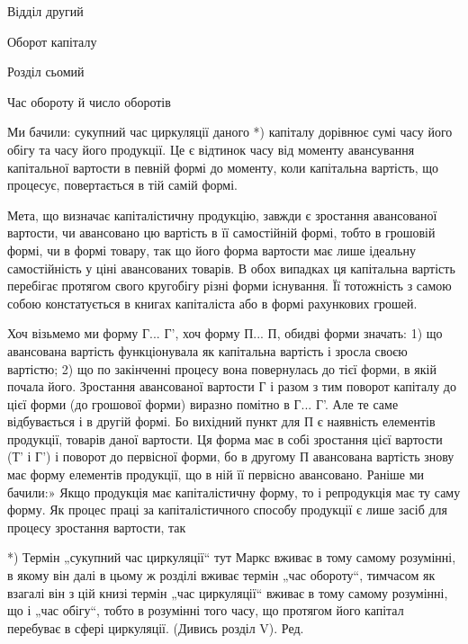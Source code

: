 Відділ другий

Оборот капіталу

Розділ сьомий

Час обороту й число оборотів

Ми бачили: сукупний час циркуляції даного *) капіталу дорівнює сумі
часу його обігу та часу його продукції. Це є відтинок часу від моменту
авансування капітальної вартости в певній формі до моменту, коли капітальна
вартість, що процесує, повертається в тій самій формі.

Мета, що визначає капіталістичну продукцію, завжди є зростання
авансованої вартости, чи авансовано цю вартість в її самостійній формі,
тобто в грошовій формі, чи в формі товару, так що його форма вартости
має лише ідеальну самостійність у ціні авансованих товарів.
В обох випадках ця капітальна вартість перебігає протягом свого кругобігу
різні форми існування. Її тотожність з самою собою констатується
в книгах капіталіста або в формі рахункових грошей.

Хоч візьмемо ми форму Г... Г', хоч форму П... П, обидві форми
значать: 1) що авансована вартість функціонувала як капітальна вартість
і зросла своєю вартістю; 2) що по закінченні процесу вона повернулась
до тієї форми, в якій почала його. Зростання авансованої вартости Г і
разом з тим поворот капіталу до цієї форми (до грошової форми) виразно
помітно в Г... Г'. Але те саме відбувається і в другій формі. Бо
вихідний пункт для П є наявність елементів продукції, товарів даної
вартости. Ця форма має в собі зростання цієї вартости (Т' і Г') і поворот
до первісної форми, бо в другому П авансована вартість
знову має форму елементів продукції, що в ній її первісно авансовано.
Раніше ми бачили:» Якщо продукція має капіталістичну форму, то
і репродукція має ту саму форму. Як процес праці за капіталістичного
способу продукції є лише засіб для процесу зростання вартости, так

*) Термін „сукупний час циркуляції“ тут Маркс вживає в тому самому розумінні,
в якому він далі в цьому ж розділі вживає термін „час обороту“, тимчасом
як взагалі він з цій книзі термін „час циркуляції“ вживає в тому самому
розумінні, що і „час обігу“, тобто в розумінні того часу, що протягом його капітал
перебуває в сфері циркуляції. (Дивись розділ V). Ред.
